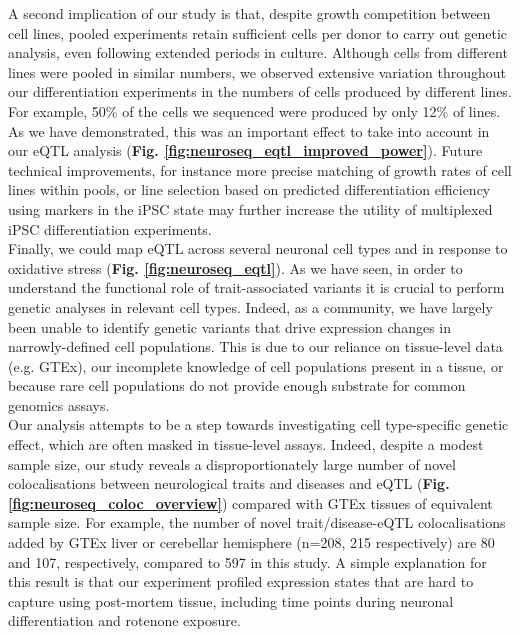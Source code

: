 A second implication of our study is that, despite growth competition between cell lines, pooled experiments retain sufficient cells per donor to carry out genetic analysis, even following extended periods in culture. 
Although cells from different lines were pooled in similar numbers, we observed extensive variation throughout our differentiation experiments in the numbers of cells produced by different lines. 
For example, 50\% of the cells we sequenced were produced by only 12\% of lines.
As we have demonstrated, this was an important effect to take into account in our eQTL analysis (\textbf{Fig. \ref{fig:neuroseq_eqtl_improved_power}}).
Future technical improvements, for instance more precise matching of growth rates of cell lines within pools, or line selection based on predicted differentiation efficiency using markers in the iPSC state may further increase the utility of multiplexed iPSC differentiation experiments.\\


Finally,
we could map eQTL across several neuronal cell types and in response to oxidative stress (\textbf{Fig. \ref{fig:neuroseq_eqtl}}).
As we have seen, in order to understand the functional role of trait-associated variants it is crucial to perform genetic analyses in relevant cell types.
Indeed, as a community, we have largely been unable to identify genetic variants that drive expression changes in narrowly-defined cell populations.
This is due to our reliance on tissue-level data (e.g. GTEx), our incomplete knowledge of cell populations present in a tissue, or because rare cell populations do not provide enough substrate for common genomics assays. \\

Our analysis attempts to be a step towards investigating cell type-specific genetic effect, which are often masked in tissue-level assays.
Indeed, despite a modest sample size, our study reveals a disproportionately large number of novel colocalisations between neurological traits and diseases and eQTL (\textbf{Fig. \ref{fig:neuroseq_coloc_overview}}) compared with GTEx tissues of equivalent sample size. 
For example, the number of novel trait/disease-eQTL colocalisations added by GTEx liver or cerebellar hemisphere (n=208, 215 respectively) are 80 and 107, respectively, compared to 597 in this study. 
A simple explanation for this result is that our experiment profiled expression states that are hard to capture using post-mortem tissue, including time points during neuronal differentiation and rotenone exposure. \\

